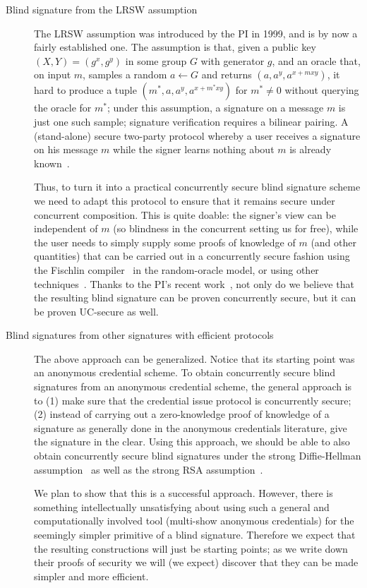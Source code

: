 \begin{description}
\item[Blind signature from the LRSW assumption] The LRSW assumption was introduced by the PI in 1999, and is by now a fairly established one.  The assumption is that, given a public key $(X,Y)= (g^x,g^y)$ in some group $G$ with generator $g$, and an oracle that, on input $m$, samples a random $a\leftarrow G$ and returns $(a,a^y,a^{x+mxy})$, it hard to produce a tuple $(m^*,a,a^y,a^{x+m^*xy})$ for $m^*\neq 0$ without querying the oracle for $m^*$; under this assumption, a signature on a message $m$ is just one such sample; signature verification requires a bilinear pairing.  A (stand-alone) secure two-party protocol whereby a user receives a signature on his message $m$ while the signer learns nothing about $m$ is already known~\cite{C:CamLys04}.  

Thus, to turn it into a practical concurrently secure blind signature scheme we need to adapt this protocol to ensure that it remains secure under concurrent composition.  This is quite doable: the signer's view can be independent of $m$ (so blindness in the concurrent setting us for free), while the user needs to simply supply some proofs of knowledge of $m$ (and other quantities) that can be carried out in a concurrently secure fashion using the Fischlin compiler~\cite{} in the random-oracle model, or using other techniques~\cite{}. Thanks to the PI's recent work~\cite{}, not only do we believe that the resulting blind signature can be proven concurrently secure, but it can be proven UC-secure as well. 

\item[Blind signatures from other signatures with efficient protocols]  The above approach can be generalized.  Notice that its starting point was an anonymous credential scheme. To obtain concurrently secure blind signatures from an anonymous credential scheme, the general approach is to (1) make sure that the credential issue protocol is concurrently secure; (2) instead of carrying out a zero-knowledge proof of knowledge of a signature as generally done in the anonymous credentials literature, give the signature in the clear.  Using this approach, we should be able to also obtain concurrently secure blind signatures under the strong Diffie-Hellman assumption~\cite{} as well as the strong RSA assumption~\cite{}.  

We plan to show that this is a successful approach.  However, there is something intellectually unsatisfying about using such a general and computationally involved tool (multi-show anonymous credentials) for the seemingly simpler primitive of a blind signature.  Therefore we expect that the resulting constructions will just be starting points; as we write down their proofs of security we will (we expect) discover that they can be made simpler and more efficient.


\end{description}
